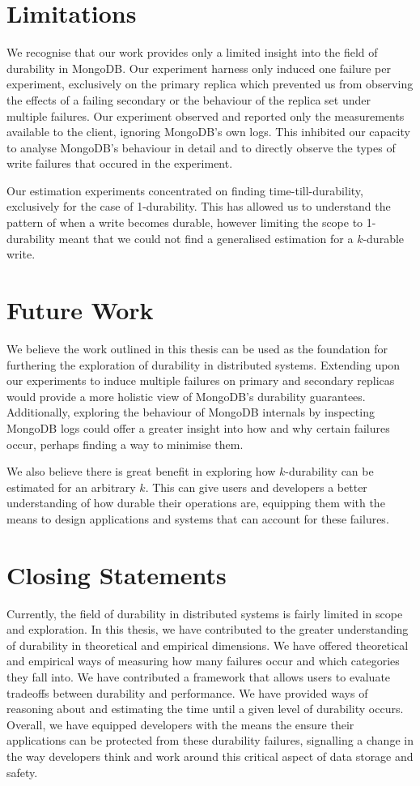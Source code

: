 \section{Limitations}
We recognise that our work provides only a limited insight into the field of durability in MongoDB. Our experiment harness only induced one failure per experiment, exclusively on the primary replica which prevented us from observing the effects of a failing secondary or the behaviour of the replica set under multiple failures. Our experiment observed and reported only the measurements available to the client, ignoring MongoDB's own logs. This inhibited our capacity to analyse MongoDB's behaviour in detail and to directly observe the types of write failures that occured in the experiment.

Our estimation experiments concentrated on finding time-till-durability, exclusively for the case of 1-durability. This has allowed us to understand the pattern of when a write becomes durable, however limiting the scope to 1-durability meant that we could not find a generalised estimation for a $k$-durable write.

\section{Future Work}
We believe the work outlined in this thesis can be used as the foundation for furthering the exploration of durability in distributed systems. Extending upon our experiments to induce multiple failures on primary and secondary replicas would provide a more holistic view of MongoDB's durability guarantees. Additionally, exploring the behaviour of MongoDB internals by inspecting MongoDB logs could offer a greater insight into how and why certain failures occur, perhaps finding a way to minimise them.

We also believe there is great benefit in exploring how $k$-durability can be estimated for an arbitrary $k$. This can give users and developers a better understanding of how durable their operations are, equipping them with the means to design applications and systems that can account for these failures.

\section{Closing Statements}
Currently, the field of durability in distributed systems is fairly limited in scope and exploration. In this thesis, we have contributed to the greater understanding of durability in theoretical and empirical dimensions. We have offered theoretical and empirical ways of measuring how many failures occur and which categories they fall into. We have contributed a framework that allows users to evaluate tradeoffs between durability and performance. We have provided ways of reasoning about and estimating the time until a given level of durability occurs. Overall, we have equipped developers with the means the ensure their applications can be protected from these durability failures, signalling a change in the way developers think and work around this critical aspect of data storage and safety.
